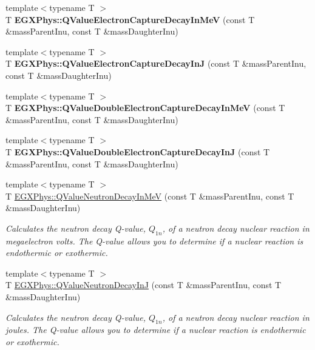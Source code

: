 \begin{DoxyCompactItemize}
{\footnotesize template$<$typename T $>$ }\\T {\bfseries E\+G\+X\+Phys\+::\+Q\+Value\+Electron\+Capture\+Decay\+In\+MeV} (const T \&mass\+Parent\+Inu, const T \&mass\+Daughter\+Inu)
\item 
\mbox{\label{group___q_value_ga7b523a7d197beb91dcda75ddde12c851}} 
{\footnotesize template$<$typename T $>$ }\\T {\bfseries E\+G\+X\+Phys\+::\+Q\+Value\+Electron\+Capture\+Decay\+InJ} (const T \&mass\+Parent\+Inu, const T \&mass\+Daughter\+Inu)
\item 
\mbox{\label{group___q_value_ga93e5774784c0d9551e46ba19e1dbc9ab}} 
{\footnotesize template$<$typename T $>$ }\\T {\bfseries E\+G\+X\+Phys\+::\+Q\+Value\+Double\+Electron\+Capture\+Decay\+In\+MeV} (const T \&mass\+Parent\+Inu, const T \&mass\+Daughter\+Inu)
\item 
\mbox{\label{group___q_value_gae25e179b76580bc6af7fa4bdf938ba4e}} 
{\footnotesize template$<$typename T $>$ }\\T {\bfseries E\+G\+X\+Phys\+::\+Q\+Value\+Double\+Electron\+Capture\+Decay\+InJ} (const T \&mass\+Parent\+Inu, const T \&mass\+Daughter\+Inu)
\item 
{\footnotesize template$<$typename T $>$ }\\T \hyperlink{group___q_value_gaf854b3ac07909a87f44be4e38ebb0c32}{E\+G\+X\+Phys\+::\+Q\+Value\+Neutron\+Decay\+In\+MeV} (const T \&mass\+Parent\+Inu, const T \&mass\+Daughter\+Inu)
\begin{DoxyCompactList}\small\item\em Calculates the neutron decay Q-\/value, $Q_{1n}$, of a neutron decay nuclear reaction in megaelectron volts. The Q-\/value allows you to determine if a nuclear reaction is endothermic or exothermic. \end{DoxyCompactList}\item 
{\footnotesize template$<$typename T $>$ }\\T \hyperlink{group___q_value_gab9ffbd12c3f814e03f0ed1fbdcba0700}{E\+G\+X\+Phys\+::\+Q\+Value\+Neutron\+Decay\+InJ} (const T \&mass\+Parent\+Inu, const T \&mass\+Daughter\+Inu)
\begin{DoxyCompactList}\small\item\em Calculates the neutron decay Q-\/value, $Q_{1n}$, of a neutron decay nuclear reaction in joules. The Q-\/value allows you to determine if a nuclear reaction is endothermic or exothermic. \end{DoxyCompactList}\item 

\end{DoxyCompactItemize}
